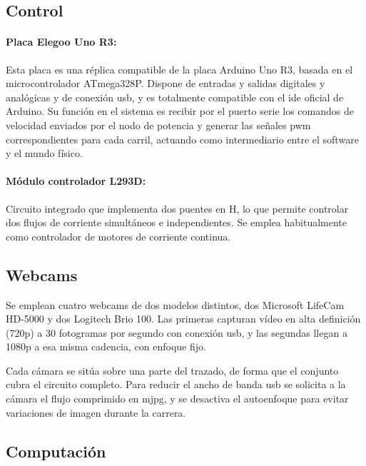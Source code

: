\subsection{Control}
\paragraph{Placa Elegoo Uno R3:}

Esta placa es una réplica compatible de la placa Arduino Uno R3, basada en el microcontrolador ATmega328P. Dispone de entradas y salidas digitales y analógicas y de conexión \gls{usb}, y es totalmente compatible con el \gls{ide} oficial de Arduino. Su función en el sistema es recibir por el puerto serie los comandos de velocidad enviados por el nodo de potencia y generar las señales \gls{pwm} correspondientes para cada carril, actuando como intermediario entre el software y el mundo físico.

\paragraph{Módulo controlador L293D:}

Circuito integrado que implementa dos puentes en H, lo que permite controlar dos flujos de corriente simultáneos e independientes. Se emplea habitualmente como controlador de motores de corriente continua. 

\subsection{Webcams}

Se emplean cuatro webcams de dos modelos distintos, dos Microsoft LifeCam HD-5000 y dos Logitech Brio 100. Las primeras capturan vídeo en alta definición (720p) a 30 fotogramas por segundo con conexión \gls{usb}, y las segundas llegan a 1080p a esa misma cadencia, con enfoque fijo. %

Cada cámara se sitúa sobre una parte del trazado, de forma que el conjunto cubra el circuito completo. Para reducir el ancho de banda \gls{usb} se solicita a la cámara el flujo comprimido en \gls{mjpg}, y se desactiva el autoenfoque para evitar variaciones de imagen durante la carrera.

\subsection{Computación}
